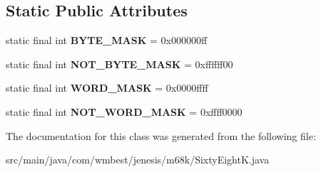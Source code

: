 \subsection*{Static Public Attributes}
\begin{DoxyCompactItemize}
\item 
\hypertarget{classcom_1_1wmbest_1_1jenesis_1_1m68k_1_1SixtyEightK_a89d165fb486aa40724eecbd1656ea305}{static final int {\bfseries B\-Y\-T\-E\-\_\-\-M\-A\-S\-K} = 0x000000ff}\label{classcom_1_1wmbest_1_1jenesis_1_1m68k_1_1SixtyEightK_a89d165fb486aa40724eecbd1656ea305}

\item 
\hypertarget{classcom_1_1wmbest_1_1jenesis_1_1m68k_1_1SixtyEightK_ad980f1bebdcbdd0a01382b8aa35d418c}{static final int {\bfseries N\-O\-T\-\_\-\-B\-Y\-T\-E\-\_\-\-M\-A\-S\-K} = 0xffffff00}\label{classcom_1_1wmbest_1_1jenesis_1_1m68k_1_1SixtyEightK_ad980f1bebdcbdd0a01382b8aa35d418c}

\item 
\hypertarget{classcom_1_1wmbest_1_1jenesis_1_1m68k_1_1SixtyEightK_a5f872548a9957c354376d879f140f0ff}{static final int {\bfseries W\-O\-R\-D\-\_\-\-M\-A\-S\-K} = 0x0000ffff}\label{classcom_1_1wmbest_1_1jenesis_1_1m68k_1_1SixtyEightK_a5f872548a9957c354376d879f140f0ff}

\item 
\hypertarget{classcom_1_1wmbest_1_1jenesis_1_1m68k_1_1SixtyEightK_a676b6196f43aa796d5d20fcced1bb797}{static final int {\bfseries N\-O\-T\-\_\-\-W\-O\-R\-D\-\_\-\-M\-A\-S\-K} = 0xffff0000}\label{classcom_1_1wmbest_1_1jenesis_1_1m68k_1_1SixtyEightK_a676b6196f43aa796d5d20fcced1bb797}

\end{DoxyCompactItemize}


The documentation for this class was generated from the following file\-:\begin{DoxyCompactItemize}
\item 
src/main/java/com/wmbest/jenesis/m68k/Sixty\-Eight\-K.\-java\end{DoxyCompactItemize}
